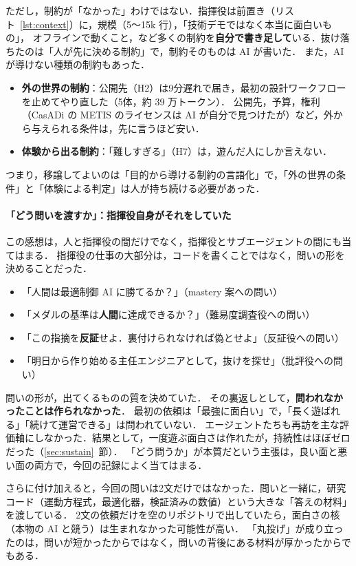 \documentclass[a4paper,10pt]{ltjsarticle}
\newcommand{\secref}[1]{\ref{#1}~節}
\newcommand{\lstref}[1]{リスト~\ref{#1}}
\begin{document}
ただし，制約が「なかった」わけではない．指揮役は前置き（\lstref{lst:context}）に，規模（5〜15k 行），「技術デモではなく本当に面白いもの」，
オフラインで動くこと，など多くの制約を\textbf{自分で書き足して}いる．抜け落ちたのは「人が先に決める制約」で，制約そのものは AI が書いた．
また，AI が導けない種類の制約もあった．
\begin{itemize}
  \item \textbf{外の世界の制約}：公開先（H2）は9分遅れで届き，最初の設計ワークフローを止めてやり直した（5体，約 39 万トークン）．
  公開先，予算，権利（CasADi の METIS のライセンスは AI が自分で見つけたが）など，外から与えられる条件は，先に言うほど安い．
  \item \textbf{体験から出る制約}：「難しすぎる」（H7）は，遊んだ人にしか言えない．
\end{itemize}
つまり，移譲してよいのは「目的から導ける制約の言語化」で，「外の世界の条件」と「体験による判定」は人が持ち続ける必要があった．

\paragraph{「どう問いを渡すか」：指揮役自身がそれをしていた}
この感想は，人と指揮役の間だけでなく，指揮役とサブエージェントの間にも当てはまる．
指揮役の仕事の大部分は，コードを書くことではなく，問いの形を決めることだった．
\begin{itemize}
  \item 「人間は最適制御 AI に勝てるか？」（mastery 案への問い）
  \item 「メダルの基準は\textbf{人間}に達成できるか？」（難易度調査役への問い）
  \item 「この指摘を\textbf{反証}せよ．裏付けられなければ偽とせよ」（反証役への問い）
  \item 「明日から作り始める主任エンジニアとして，抜けを探せ」（批評役への問い）
\end{itemize}
問いの形が，出てくるものの質を決めていた．
その裏返しとして，\textbf{問われなかったことは作られなかった}．
最初の依頼は「最強に面白い」で，「長く遊ばれる」「続けて運営できる」は問われていない．
エージェントたちも再訪を主な評価軸にしなかった．結果として，一度遊ぶ面白さは作れたが，持続性はほぼゼロだった（\secref{sec:sustain}）．
「どう問うか」が本質だという主張は，良い面と悪い面の両方で，今回の記録によく当てはまる．

さらに付け加えると，今回の問いは2文だけではなかった．問いと一緒に，研究コード（運動方程式，最適化器，検証済みの数値）という大きな「答えの材料」を渡している．
2文の依頼だけを空のリポジトリで出していたら，面白さの核（本物の AI と競う）は生まれなかった可能性が高い．
「丸投げ」が成り立ったのは，問いが短かったからではなく，問いの背後にある材料が厚かったからでもある．
\end{document}
